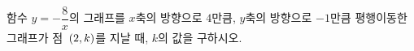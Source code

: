 함수 $y=-\dfrac{8}{x}$의 그래프를 $x$축의 방향으로 $4$만큼, $y$축의 방향으로 $-1$만큼 평행이동한 그래프가 점~$(2{,}\mkern3mu\mathopen{}k)$를 지날 때, $k$의 값을 구하시오.

